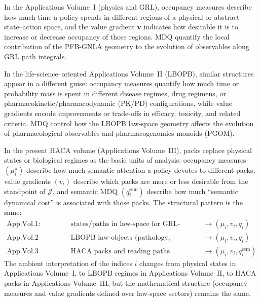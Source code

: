 \documentclass[11pt]{book}
\theoremstyle{plain}
\theoremstyle{definition}
\theoremstyle{remark}
\begin{document}
In the Applications Volume~I (physics and GRL), occupancy measures
describe how much time a policy spends in different regions of a
physical or abstract state–action space, and the value gradient
$\mathbf{v}$ indicates how desirable it is to increase or decrease
occupancy of those regions. MDQ quantify the local contribution of the
PFB-GNLA geometry to the evolution of observables along GRL path
integrals.

In the life-science–oriented Applications Volume~II (LBOPB), similar
structures appear in a different guise: occupancy measures quantify how
much time or probability mass is spent in different disease regimes,
drug regimens, or pharmacokinetic/pharmacodynamic (PK/PD)
configurations, while value gradients encode improvements or trade-offs
in efficacy, toxicity, and related criteria. MDQ control how the LBOPB
law-space geometry affects the evolution of pharmacological observables
and pharmacogenomics monoids (PGOM).

In the present HACA volume (Applications Volume~III), packs replace
physical states or biological regimes as the basic units of analysis:
occupancy measures $(\mu_i^\pi)$ describe how much semantic attention a
policy devotes to different packs, value gradients $(v_i)$ describe
which packs are more or less desirable from the standpoint of
$\mathcal{J}$, and semantic MDQ $(q_i^{\mathrm{sem}})$ describe how much
``semantic dynamical cost'' is associated with those packs. The
structural pattern is the same:
\[
\begin{array}{lll}
  \text{App.Vol.1:} &
    \text{states/paths in law-space for GRL-based physics} &
    \longrightarrow (\mu_i, v_i, q_i) \\[0.3em]
  \text{App.Vol.2 (LBOPB):} &
    \text{LBOPB law-objects (pathology, PK/PD, PGOM)} &
    \longrightarrow (\mu_i, v_i, q_i) \\[0.3em]
  \text{App.Vol.3 (HACA):} &
    \text{HACA packs and reading paths} &
    \longrightarrow (\mu_i, v_i, q_i^{\mathrm{sem}})
\end{array}
\]
The ambient interpretation of the indices $i$ changes from physical
states in Applications Volume~I, to LBOPB regimes in Applications
Volume~II, to HACA packs in Applications Volume~III, but the
mathematical structure (occupancy measures and value gradients defined
over law-space sectors) remains the same.
\end{document}
